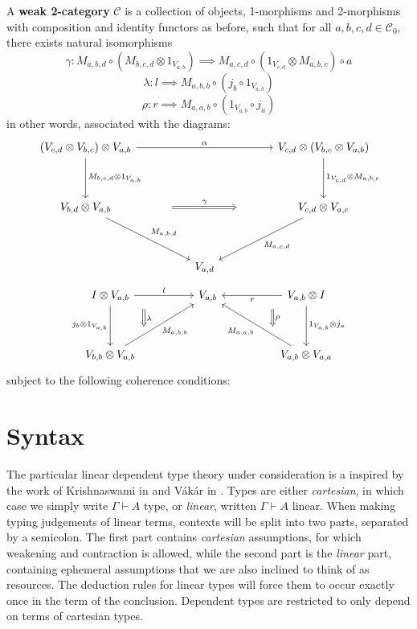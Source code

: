 \begin{defn}
  A \textbf{weak 2-category} $\mathcal{C}$ is a collection of objects, 1-morphisms and 2-morphisms with composition and identity functors as before, such that for all $a, b, c, d \in \mathcal{C}_0$, there exists natural isomorphisms
  \[
    \gamma :  M_{a,b,d} \circ (M_{b,c,d} \otimes 1_{V_{a,b}}) \implies M_{a, c, d} \circ (1_{V_{c, d}} \otimes M_{a, b, c}) \circ a
  \]
  \[
    \lambda : l \implies M_{a, b, b} \circ (j_b \circ 1_{V_{a,b}})
  \]
  \[
    \rho : r \implies M_{a, a, b} \circ (1_{V_{a,b}} \circ j_a)
  \]
  in other words, associated with the diagrams:
  \[
    \ti
    (V_{c, d} \otimes V_{b, c}) \otimes V_{a, b} \ar[d, "{M_{b, c, d} \otimes 1_{V_{a,b}}}"] \ar[rr, "\alpha"] & & V_{c, d} \otimes (V_{b, c} \otimes V_{a, b}) \ar[d, "{1_{V_{c,d}} \otimes M_{a, b, c}}"]\\
    V_{b, d} \otimes V_{a, b} \ar[rd, "M_{a, b, d}"] \ar[rr, "\gamma", Rightarrow, shorten <=50pt,shorten >=50pt]& & V_{c, d} \otimes V_{a, c} \ar[ld, "M_{a, c, d}"]\\
    & V_{a, d}      &
    \kz
  \]
  \[
    \ti
    I \otimes V_{a, b} \ar[d, "j_b \otimes 1_{V_{a, b}}", swap] \ar[d, "\lambda", Rightarrow, xshift=30pt, shorten <=10pt,shorten >=10pt, yshift=7pt] \ar[r, "l"] & V_{a, b} & V_{a, b} \otimes I \ar[l, "r"] \ar[d, "1_{V_{a, b}} \otimes j_a"] \ar[d, "\rho", Rightarrow, xshift=-30pt, shorten <=10pt,shorten >=10pt, yshift=7pt] \\
    V_{b, b} \otimes V_{a, b} \ar[ru, "M_{a, b, b}",swap] & & V_{a, b} \otimes V_{a, a} \ar[lu, "M_{a, a, b}"]
    \kz
  \]
  subject to the following coherence conditions:
\end{defn}


%
\section{Syntax}
The particular linear dependent type theory under consideration is a inspired by the work of Krishnaswami in \cite{krishnaswami} and Vákár in \cite{vakar14}. Types are either \textit{cartesian}, in which case we simply write $\Gamma \vdash A \text{ type}$, or \textit{linear}, written $\Gamma \vdash A \text{ linear}$. When making typing judgements of linear terms, contexts will be split into two parts, separated by a semicolon. The first part contains \textit{cartesian} assumptions, for which weakening and contraction is allowed, while the second part is the \textit{linear} part, containing ephemeral assumptions that we are also inclined to think of as resources. The deduction rules for linear types will force them to occur exactly once in the term of the conclusion. Dependent types are restricted to only depend on terms of cartesian types. 
